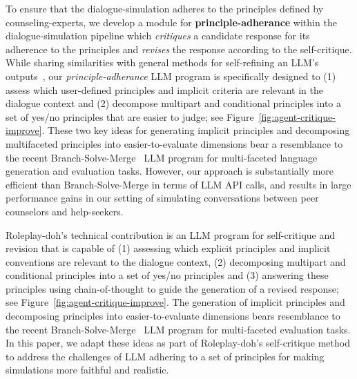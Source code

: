 To ensure that the dialogue-simulation adheres to the principles defined by counseling-experts, we develop a module for \textbf{principle-adherance} within the dialogue-simulation pipeline which \textit{critiques} a candidate response for its adherence to the principles and \textit{revises} the response according to the self-critique. While sharing similarities with general methods for self-refining an LLM's outputs~\cite{madaan2023selfrefine}, our \textit{principle-adherance} LLM program is specifically designed to (1) assess which user-defined principles and implicit criteria are relevant in the dialogue context and (2) decompose multipart and conditional principles into a set of yes/no principles that are easier to judge; see Figure~\ref{fig:agent-critique-improve}. These two key ideas for generating implicit principles and decomposing multifaceted principles into easier-to-evaluate dimensions bear a resemblance to the recent Branch-Solve-Merge~\cite{saha2023branchsolvemerge} LLM program for multi-faceted language generation and evaluation tasks. However, our approach is substantially more efficient than Branch-Solve-Merge in terms of LLM API calls, and results in large performance gains in our setting of simulating conversations between peer counselors and help-seekers.



Roleplay-doh's technical contribution is an LLM program for self-critique and revision that is capable of (1) assessing which explicit principles and implicit conventions are relevant to the dialogue context, (2) decomposing multipart and conditional principles into a set of yes/no principles and (3) answering these principles using chain-of-thought to guide the generation of a revised response; see Figure~\ref{fig:agent-critique-improve}. The generation of implicit principles and decomposing principles into easier-to-evaluate dimensions bears resemblance to the recent Branch-Solve-Merge~\cite{saha2023branchsolvemerge} LLM program for multi-faceted evaluation tasks. In this paper, we adapt these ideas as part of Roleplay-doh's self-critique method to address the challenges of LLM adhering to a set of principles for making simulations more faithful and realistic. 
\fi 

